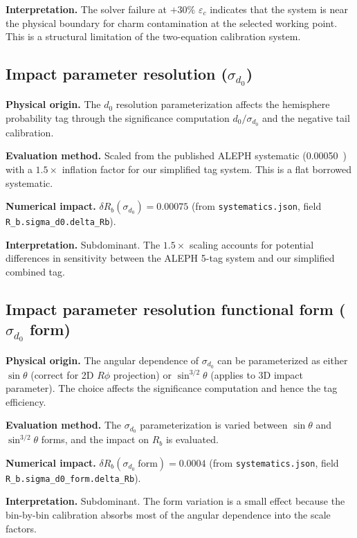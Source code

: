 \documentclass[11pt,a4paper]{article}
\begin{document}
\textbf{Interpretation.} The solver failure at $+30\%$ $\varepsilon_c$ indicates
that the system is near the physical boundary for charm contamination at the
selected working point. This is a structural limitation of the two-equation
calibration system.

\subsection{Impact parameter resolution ($\sigma_{d_0}$)}
\label{sec:syst_sigma_d0}

\textbf{Physical origin.} The $d_0$ resolution parameterization affects the hemisphere
probability tag through the significance computation $d_0/\sigma_{d_0}$ and the negative
tail calibration.

\textbf{Evaluation method.} Scaled from the published ALEPH systematic
(0.00050~\cite{ALEPH:Rb:1996}) with a $1.5\times$ inflation factor for our simplified
tag system. This is a flat borrowed systematic.

\textbf{Numerical impact.}
$\delta R_b(\sigma_{d_0}) = 0.00075$
(from \texttt{systematics.json}, field \texttt{R\_b.sigma\_d0.delta\_Rb}).

\textbf{Interpretation.} Subdominant. The $1.5\times$ scaling accounts for potential
differences in sensitivity between the ALEPH 5-tag system and our simplified combined tag.

\subsection{Impact parameter resolution functional form ($\sigma_{d_0}$ form)}
\label{sec:syst_sigma_d0_form}

\textbf{Physical origin.} The angular dependence of $\sigma_{d_0}$ can be parameterized
as either $\sin\theta$ (correct for 2D $R\phi$ projection) or $\sin^{3/2}\theta$
(applies to 3D impact parameter). The choice affects the significance computation
and hence the tag efficiency.

\textbf{Evaluation method.} The $\sigma_{d_0}$ parameterization is varied between
$\sin\theta$ and $\sin^{3/2}\theta$ forms, and the impact on $R_b$ is evaluated.

\textbf{Numerical impact.}
$\delta R_b(\sigma_{d_0}\;\mathrm{form}) = 0.0004$
(from \texttt{systematics.json}, field \texttt{R\_b.sigma\_d0\_form.delta\_Rb}).

\textbf{Interpretation.} Subdominant. The form variation is a small effect because
the bin-by-bin calibration absorbs most of the angular dependence into the scale factors.
\end{document}
